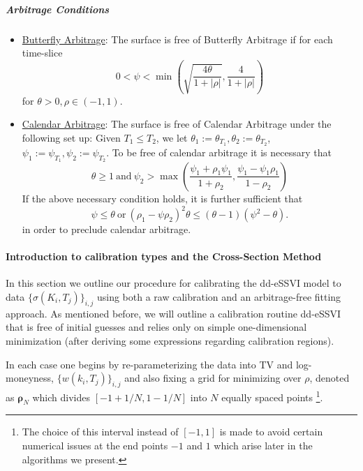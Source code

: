 \documentclass[11pt,letterpaper]{article}
\begin{document}
\subparagraph{Arbitrage Conditions}
\begin{itemize}
\item \underline{Butterfly Arbitrage}: The surface is free of Butterfly Arbitrage if for each time-slice
\begin{equation}
0 < \psi < \min\left( \sqrt{\frac{4\theta}{1 + |\rho|}  }, \frac{4}{1+|\rho|}   \right)
\label{eqn:butterfly}
\end{equation}
for $\theta > 0 , \rho \in (-1,1)$.
\item \underline{Calendar Arbitrage}: The surface is free of Calendar Arbitrage under the following set up: Given $T_1 \leq T_2$, we let $\theta_1 := \theta_{T_1}, \theta_2 := \theta_{T_2}$, $\psi_1 := \psi_{T_1}, \psi_2 := \psi_{T_2}$. To be free of calendar arbitrage it is necessary that 
\begin{equation}
\theta \geq 1 \ \text{and} \ \psi_2 > \max\left( \frac{\psi_1 + \rho_1 \psi_1}{1 + \rho_2} , \frac{\psi_1 - \psi_1\rho_1}{1 - \rho_2}  \right)
\label{eqn:calendar1}
\end{equation}
If the above necessary condition holds, it is further sufficient that
\begin{equation}
\psi \leq \theta \ \text{or} \ (\rho_1 - \psi \rho_2)^2 \theta \leq ( \theta -1)( \psi^2 - \theta).
\label{eqn:calendar2}
\end{equation}
in order to preclude calendar arbitrage.
\end{itemize}

\paragraph{Introduction to calibration types and the Cross-Section Method}

In this section we outline our procedure for calibrating the dd-eSSVI model to data $\{ \sigma(K_i,T_j) \}_{i,j}$ using both a raw calibration and an arbitrage-free fitting approach. As mentioned before, we will outline a calibration routine dd-eSSVI that is free of initial guesses and relies only on simple one-dimensional minimization (after deriving some expressions regarding calibration regions). 

In each case one begins by re-parameterizing the data into TV and log-moneyness, $\{ w(k_i,T_j) \}_{i,j}$ and also fixing a grid for minimizing over $\rho$, denoted as $\pmb{\rho}_N$ which divides $[-1 + 1/N,1 - 1/N]$ into $N$ equally spaced points \footnote{The choice of this interval instead of $[-1,1]$ is made to avoid certain numerical issues at the end points $-1$ and $1$ which arise later in the algorithms we present.}. 
\end{document}
